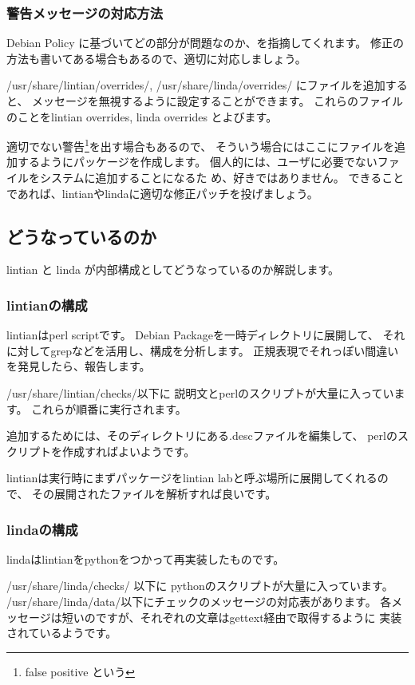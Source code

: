 \documentclass[mingoth]{jsarticle}
\begin{document}
\subsubsection{警告メッセージの対応方法}

Debian Policy に基づいてどの部分が問題なのか、を指摘してくれます。
修正の方法も書いてある場合もあるので、適切に対応しましょう。

/usr/share/lintian/overrides/,
/usr/share/linda/overrides/
にファイルを追加すると、
メッセージを無視するように設定することができます。
これらのファイルのことをlintian overrides, linda overrides とよびます。

適切でない警告\footnote{false positive という}を出す場合もあるので、
そういう場合にはここにファイルを追加するようにパッケージを作成します。
個人的には、ユーザに必要でないファイルをシステムに追加することになるた
め、好きではありません。
できることであれば、lintianやlindaに適切な修正パッチを投げましょう。

\subsection{どうなっているのか}

lintian と  linda が内部構成としてどうなっているのか解説します。

\subsubsection{lintianの構成}

lintianはperl scriptです。
Debian Packageを一時ディレクトリに展開して、
それに対してgrepなどを活用し、構成を分析します。
正規表現でそれっぽい間違いを発見したら、報告します。

/usr/share/lintian/checks/以下に
説明文とperlのスクリプトが大量に入っています。
これらが順番に実行されます。

追加するためには、そのディレクトリにある.descファイルを編集して、
perlのスクリプトを作成すればよいようです。

lintianは実行時にまずパッケージをlintian labと呼ぶ場所に展開してくれるの
で、
その展開されたファイルを解析すれば良いです。

\subsubsection{lindaの構成}

lindaはlintianをpythonをつかって再実装したものです。

/usr/share/linda/checks/ 以下に
pythonのスクリプトが大量に入っています。
/usr/share/linda/data/以下にチェックのメッセージの対応表があります。
各メッセージは短いのですが、それぞれの文章はgettext経由で取得するように
実装されているようです。
\end{document}

